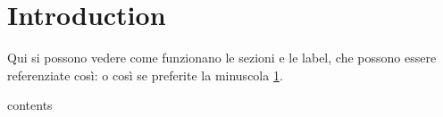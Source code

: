 
\chapter{Introduction}
\label{cap:introduction}

Qui si possono vedere come funzionano le sezioni e le label, che possono essere referenziate così:  o così se preferite la minuscola \cref{cap:introduction}.




contents